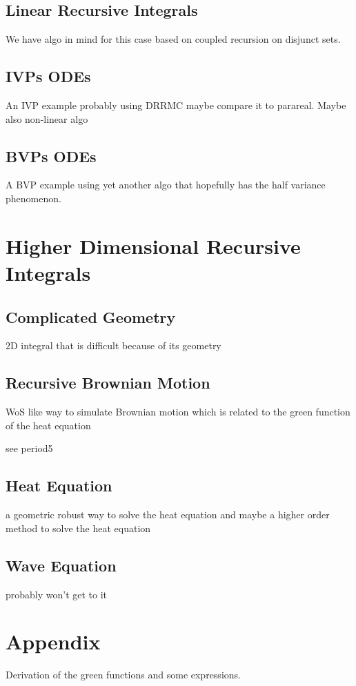 \documentclass[a4paper,12pt]{article}
\begin{document}
\subsection{Linear Recursive Integrals}
We have algo in mind for this case based on coupled recursion on disjunct sets.


\subsection{IVPs ODEs}
An IVP example probably using DRRMC maybe compare it to parareal. Maybe also non-linear algo

\subsection{BVPs ODEs}
A BVP example using yet another algo that hopefully has the half variance phenomenon.

\section{Higher Dimensional Recursive Integrals}
\subsection{Complicated Geometry}
\begin{example}
    $2$D integral that is difficult because of its geometry
\end{example}

\subsection{Recursive Brownian Motion}
WoS like way to simulate Brownian motion which is related to the green function
of the heat equation

\begin{example}
    see period5
\end{example}

\subsection{Heat Equation}
a geometric robust way to solve the heat equation and maybe a higher order method to solve
the heat equation

\subsection{Wave Equation}
probably won't get to it

\newpage
\printbibliography
\newpage

\section{Appendix}
Derivation of the green functions and some expressions.
\end{document}
